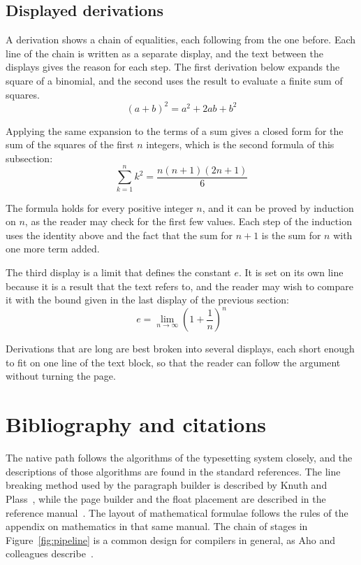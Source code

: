 \documentclass{article}
\begin{document}
\subsection{Displayed derivations}\label{sec:derivations}

A derivation shows a chain of equalities, each following from the one before. Each line
of the chain is written as a separate display, and the text between the displays gives
the reason for each step. The first derivation below expands the square of a binomial,
and the second uses the result to evaluate a finite sum of squares.
\[
  (a+b)^{2} = a^{2} + 2ab + b^{2}
\]

Applying the same expansion to the terms of a sum gives a closed form for the sum of the
squares of the first $n$ integers, which is the second formula of this subsection:
\[
  \sum_{k=1}^{n} k^{2} = \frac{n(n+1)(2n+1)}{6}
\]

The formula holds for every positive integer $n$, and it can be proved by induction on
$n$, as the reader may check for the first few values. Each step of the induction
uses the identity above and the fact that the sum for $n+1$ is the sum for $n$ with one
more term added.

The third display is a limit that defines the constant $e$. It is set on its own line
because it is a result that the text refers to, and the reader may wish to compare it
with the bound given in the last display of the previous section:
\[
  e = \lim_{n\to\infty} \left( 1 + \frac{1}{n} \right)^{n}
\]

Derivations that are long are best broken into several displays, each short enough to
fit on one line of the text block, so that the reader can follow the argument without
turning the page.

\section{Bibliography and citations}\label{sec:refs}

The native path follows the algorithms of the typesetting system closely, and the
descriptions of those algorithms are found in the standard references. The line
breaking method used by the paragraph builder is described by Knuth and
Plass~\cite{knuth81}, while the page builder and the float placement are described in
the reference manual~\cite{knuth86}. The layout of mathematical formulae follows the
rules of the appendix on mathematics in that same manual. The chain of stages in
Figure~\ref{fig:pipeline} is a common design for compilers in general, as Aho and
colleagues describe~\cite{aho06}.
\end{document}

